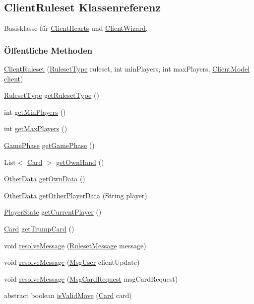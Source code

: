 \hypertarget{a00056}{\subsection{Client\-Ruleset Klassenreferenz}
\label{a00056}
}


Basisklasse für \hyperlink{a00055}{Client\-Hearts} und \hyperlink{a00057}{Client\-Wizard}.

\subsubsection*{Öffentliche Methoden}
\begin{DoxyCompactItemize}
\item 
\hyperlink{a00056_a1cfcda2bcff350b5c0083e931ba49219}{Client\-Ruleset} (\hyperlink{a00066}{Ruleset\-Type} ruleset, int min\-Players, int max\-Players, \hyperlink{a00003}{Client\-Model} \hyperlink{a00056_a937cb3d928d5cde5863e895e163b048e}{client})
\item 
\hyperlink{a00066}{Ruleset\-Type} \hyperlink{a00056_a3ac0f377128f45d56b53fee6a22a525e}{get\-Ruleset\-Type} ()
\item 
int \hyperlink{a00056_ae52f9f6999c512f3fad72c38b1f212d7}{get\-Min\-Players} ()
\item 
int \hyperlink{a00056_aa019a8bc2bbcb20450ace4f9b481fc34}{get\-Max\-Players} ()
\item 
\hyperlink{a00060}{Game\-Phase} \hyperlink{a00056_a6cba00c7720cc8d49c42a6cd5cd7bca1}{get\-Game\-Phase} ()
\item 
List$<$ \hyperlink{a00054}{Card} $>$ \hyperlink{a00056_a1b82d59f9b439be5785c6faffd4d3c05}{get\-Own\-Hand} ()
\item 
\hyperlink{a00064}{Other\-Data} \hyperlink{a00056_a4173e0089631ea0b571bef5965547cf6}{get\-Own\-Data} ()
\item 
\hyperlink{a00064}{Other\-Data} \hyperlink{a00056_abb320c3a473c538ecee368f8cdd4e44b}{get\-Other\-Player\-Data} (String player)
\item 
\hyperlink{a00065}{Player\-State} \hyperlink{a00056_ad3e8a11e9c53ca1b4bb6e753e48ef5ed}{get\-Current\-Player} ()
\item 
\hyperlink{a00054}{Card} \hyperlink{a00056_a278ccc7c69243be691f69d421cf7420a}{get\-Trump\-Card} ()
\item 
void \hyperlink{a00056_a7544deba8485150e5417e8a7061f7770}{resolve\-Message} (\hyperlink{a00053}{Ruleset\-Message} message)
\item 
void \hyperlink{a00056_a0538138e8aea44d9ef7b9d55bd0d1128}{resolve\-Message} (\hyperlink{a00052}{Msg\-User} client\-Update)
\item 
void \hyperlink{a00056_a8a1a3d8ac4df5ec0c46a7d501d7c7f82}{resolve\-Message} (\hyperlink{a00044}{Msg\-Card\-Request} msg\-Card\-Request)
\item 
abstract boolean \hyperlink{a00056_a48cc9b97dd2832c14668fac3a6f5be1a}{is\-Valid\-Move} (\hyperlink{a00054}{Card} card)
\end{DoxyCompactItemize}
